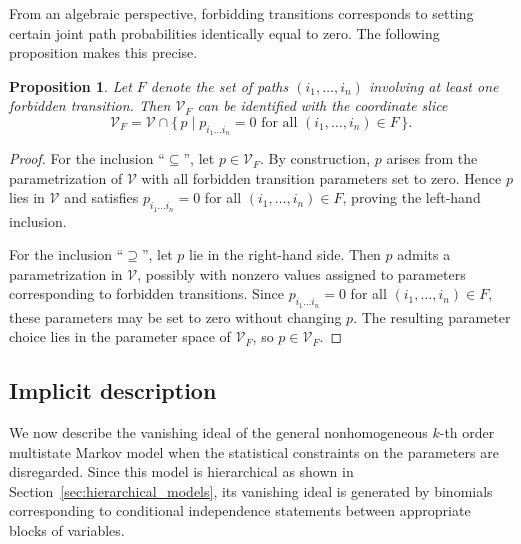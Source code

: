 \documentclass[11pt, a4paper]{article}
\numberwithin{equation}{section}
\theoremstyle{plain}
\newtheorem{proposition}[theorem]{Proposition}
\theoremstyle{definition}
\begin{document}
From an algebraic perspective, forbidding transitions corresponds to setting certain joint path
probabilities identically equal to zero.
The following proposition makes this precise.
\begin{proposition}
\label{prop:restricted_model_slice}
Let $F$ denote the set of paths
$(i_1, \ldots, i_n)$  involving at least one forbidden transition. 
Then $\mathcal{V}_F$ can be identified with the coordinate slice
\[
\mathcal{V}_F
=
\mathcal{V}
\cap
\{\,p \mid p_{i_1 \ldots i_n}=0
\text{ for all }  (i_1, \ldots, i_n)\in F  \,\}.
\]
\end{proposition}
\begin{proof}
For the inclusion ``$\subseteq$'', let $p\in\mathcal{V}_F$.
By construction, $p$ arises from the parametrization of $\mathcal{V}$ with all
forbidden transition parameters set to zero.
Hence $p$ lies in $\mathcal{V}$ and satisfies $p_{i_1 \ldots i_n}=0$ for all
$(i_1, \ldots, i_n)\in F$, proving the left-hand inclusion.

For the inclusion ``$\supseteq$'', let $p$ lie in the right-hand side.
Then $p$ admits a parametrization in $\mathcal{V}$, possibly with nonzero values
assigned to parameters corresponding to forbidden transitions.
Since $p_{i_1 \ldots i_n}=0$ for all
 $(i_1, \ldots, i_n)\in F$, these
parameters may be set to zero without changing $p$.
The resulting parameter choice lies in the parameter space of $\mathcal{V}_F$,
so $p\in\mathcal{V}_F$.
\end{proof}



\subsection{Implicit description} \label{sec:implicit_description_nonhomogeneous_subsection}



We now describe the vanishing ideal of the general nonhomogeneous $k$-th order multistate Markov model when the statistical constraints on the parameters are disregarded.
Since this model is hierarchical as shown in Section~\ref{sec:hierarchical_models}, its vanishing ideal is generated by binomials corresponding to
conditional independence statements between appropriate blocks of variables.
\end{document}
